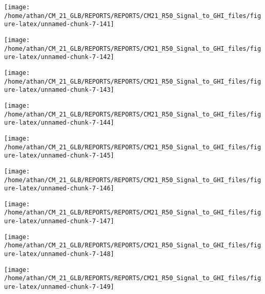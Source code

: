 \documentclass[
  11pt,
  a4paper,oneside]{article}
\begin{document}
\begin{center}\texttt{[image: /home/athan/CM\_21\_GLB/REPORTS/REPORTS/CM21\_R50\_Signal\_to\_GHI\_files/figure-latex/unnamed-chunk-7-141]} \end{center}

\begin{center}\texttt{[image: /home/athan/CM\_21\_GLB/REPORTS/REPORTS/CM21\_R50\_Signal\_to\_GHI\_files/figure-latex/unnamed-chunk-7-142]} \end{center}

\begin{center}\texttt{[image: /home/athan/CM\_21\_GLB/REPORTS/REPORTS/CM21\_R50\_Signal\_to\_GHI\_files/figure-latex/unnamed-chunk-7-143]} \end{center}

\begin{center}\texttt{[image: /home/athan/CM\_21\_GLB/REPORTS/REPORTS/CM21\_R50\_Signal\_to\_GHI\_files/figure-latex/unnamed-chunk-7-144]} \end{center}

\begin{center}\texttt{[image: /home/athan/CM\_21\_GLB/REPORTS/REPORTS/CM21\_R50\_Signal\_to\_GHI\_files/figure-latex/unnamed-chunk-7-145]} \end{center}

\begin{center}\texttt{[image: /home/athan/CM\_21\_GLB/REPORTS/REPORTS/CM21\_R50\_Signal\_to\_GHI\_files/figure-latex/unnamed-chunk-7-146]} \end{center}

\begin{center}\texttt{[image: /home/athan/CM\_21\_GLB/REPORTS/REPORTS/CM21\_R50\_Signal\_to\_GHI\_files/figure-latex/unnamed-chunk-7-147]} \end{center}

\begin{center}\texttt{[image: /home/athan/CM\_21\_GLB/REPORTS/REPORTS/CM21\_R50\_Signal\_to\_GHI\_files/figure-latex/unnamed-chunk-7-148]} \end{center}

\begin{center}\texttt{[image: /home/athan/CM\_21\_GLB/REPORTS/REPORTS/CM21\_R50\_Signal\_to\_GHI\_files/figure-latex/unnamed-chunk-7-149]} \end{center}

\FloatBarrier
\end{document}
